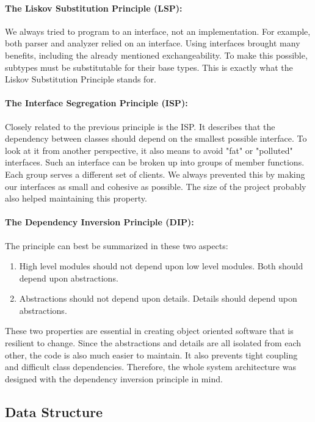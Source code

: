 \paragraph{The Liskov Substitution Principle (LSP):}
We always tried to program to an interface, not an implementation. For example, both parser and analyzer relied on an interface. Using interfaces brought many benefits, including the already mentioned exchangeability. To make this possible, subtypes must be substitutable for their base types. This is exactly what the Liskov Substitution Principle stands for. 
\paragraph{The Interface Segregation Principle (ISP):}
Closely related to the previous principle is the ISP. It describes that the dependency between classes should depend on the smallest possible interface. To look at it from another perspective, it also means to avoid "fat" or "polluted" interfaces. Such an interface can be broken up into groups of member functions. Each group serves a different set of clients. We always prevented this by making our interfaces as small and cohesive as possible. The size of the project probably also helped maintaining this property.
\paragraph{The Dependency Inversion Principle (DIP):}
The principle can best be summarized in these two aspects:
\begin{enumerate}
\item High level modules should not depend upon low level modules. Both should depend upon abstractions.
\item Abstractions should not depend upon details. Details should depend upon abstractions.
\end{enumerate}
These two properties are essential in creating object oriented software that is resilient to change. Since the abstractions and details are all isolated from each other, the code is also much easier to maintain. It also prevents tight coupling and difficult class dependencies. Therefore, the whole system architecture was designed with the dependency inversion principle in mind.

\subsection{Data Structure}\label{sec:data_structures}

